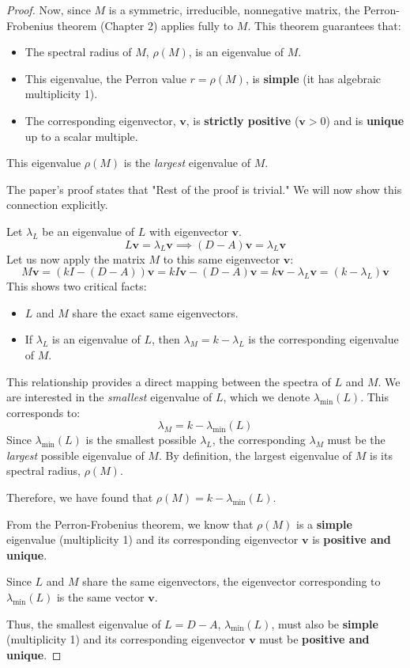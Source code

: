 \documentclass[12pt,a4paper]{report}
\theoremstyle{plain}
\theoremstyle{definition}
\theoremstyle{remark}
\begin{document}
\begin{proof}
Now, since $M$ is a symmetric, irreducible, nonnegative matrix, the Perron-Frobenius theorem (Chapter 2) applies fully to $M$. This theorem guarantees that:
\begin{itemize}
    \item The spectral radius of $M$, $\rho(M)$, is an eigenvalue of $M$.
    \item This eigenvalue, the Perron value $r = \rho(M)$, is \textbf{simple} (it has algebraic multiplicity 1).
    \item The corresponding eigenvector, $\bm{v}$, is \textbf{strictly positive} ($\bm{v} > 0$) and is \textbf{unique} up to a scalar multiple.
\end{itemize}
This eigenvalue $\rho(M)$ is the \textit{largest} eigenvalue of $M$.

The paper's proof states that "Rest of the proof is trivial." We will now show this connection explicitly.

Let $\lambda_L$ be an eigenvalue of $L$ with eigenvector $\bm{v}$.
$$ L\bm{v} = \lambda_L \bm{v} \implies (D-A)\bm{v} = \lambda_L \bm{v} $$
Let us now apply the matrix $M$ to this same eigenvector $\bm{v}$:
$$ M\bm{v} = (kI - (D-A))\bm{v} = kI\bm{v} - (D-A)\bm{v} = k\bm{v} - \lambda_L \bm{v} = (k - \lambda_L)\bm{v} $$
This shows two critical facts:
\begin{itemize}
    \item $L$ and $M$ share the exact same eigenvectors.
    \item If $\lambda_L$ is an eigenvalue of $L$, then $\lambda_M = k - \lambda_L$ is the corresponding eigenvalue of $M$.
\end{itemize}
This relationship provides a direct mapping between the spectra of $L$ and $M$. We are interested in the \textit{smallest} eigenvalue of $L$, which we denote $\lambda_{\min}(L)$. This corresponds to:
$$ \lambda_M = k - \lambda_{\min}(L) $$
Since $\lambda_{\min}(L)$ is the smallest possible $\lambda_L$, the corresponding $\lambda_M$ must be the \textit{largest} possible eigenvalue of $M$. By definition, the largest eigenvalue of $M$ is its spectral radius, $\rho(M)$.

Therefore, we have found that $\rho(M) = k - \lambda_{\min}(L)$.

From the Perron-Frobenius theorem, we know that $\rho(M)$ is a \textbf{simple} eigenvalue (multiplicity 1) and its corresponding eigenvector $\bm{v}$ is \textbf{positive and unique}.

Since $L$ and $M$ share the same eigenvectors, the eigenvector corresponding to $\lambda_{\min}(L)$ is the same vector $\bm{v}$.

Thus, the smallest eigenvalue of $L = D-A$, $\lambda_{\min}(L)$, must also be \textbf{simple} (multiplicity 1) and its corresponding eigenvector $\bm{v}$ must be \textbf{positive and unique}.
\end{proof}
\end{document}
